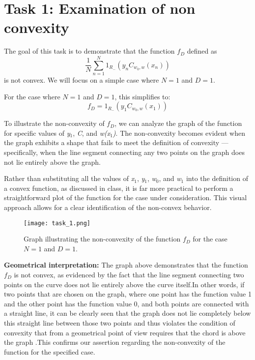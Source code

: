 \documentclass[a4paper,12pt]{report}
\begin{document}
\section{Task 1: Examination of non convexity}

The goal of this task is to demonstrate that the function \( f_D \) defined as
\begin{equation} \label{eq:fd_full}
    \frac{1}{N} \sum_{n=1}^{N} 1_{R_-}(y_n C_{w_0, w}(x_n))
\end{equation}
is not convex. We will focus on a simple case where \( N = 1 \) and \( D = 1 \).

For the case where \( N = 1 \) and \( D = 1 \), this simplifies to:
\begin{equation} \label{eq:fd_simple}
    f_D =  1_{R_-}( y_1 C_{w_0,w}(x_1) )
\end{equation}


To illustrate the non-convexity of \( f_D \), we can analyze the graph of the function for specific values of \textit{y\(_1\)}, \textit{C}, and \textit{w(x\(_1\))}. The non-convexity becomes evident when the graph exhibits a shape that fails to meet the definition of convexity — specifically, when the line segment connecting any two points on the graph does not lie entirely above the graph.

Rather than substituting all the values of \textit{x\(_1\)}, \textit{y\(_1\)}, \textit{w\(_0\)}, and \textit{w\(_1\)} into the definition of a convex function, as discussed in class, it is far more practical to perform a straightforward plot of the function for the case under consideration. This visual approach allows for a clear identification of the non-convex behavior.

 \newpage

\begin{figure}[h]
        \centering
\texttt{[image: task\_1.png]}
                \centering
    \caption{Graph illustrating the non-convexity of the function \( f_D \) for the case \( N = 1 \) and \( D = 1 \).}
    \label{fig:non_convexity}
\end{figure}

\textbf{Geometrical interpretation:} The graph above demonstrates that the function \( f_D \) is not convex, as evidenced by the fact that the line segment connecting two points on the curve does not lie entirely above the curve itself.In other words, if two points that are chosen on the graph, where one point has the function value 1 and the other point has the function value 0, and both points are connected with a straight line, it can be clearly seen that the graph does not lie completely below this straight line between those two points and thus violates the condition of convexity that from a geometrical point of view requires that the chord is above the graph .This confirms our assertion regarding the non-convexity of the function for the specified case.
\end{document}
